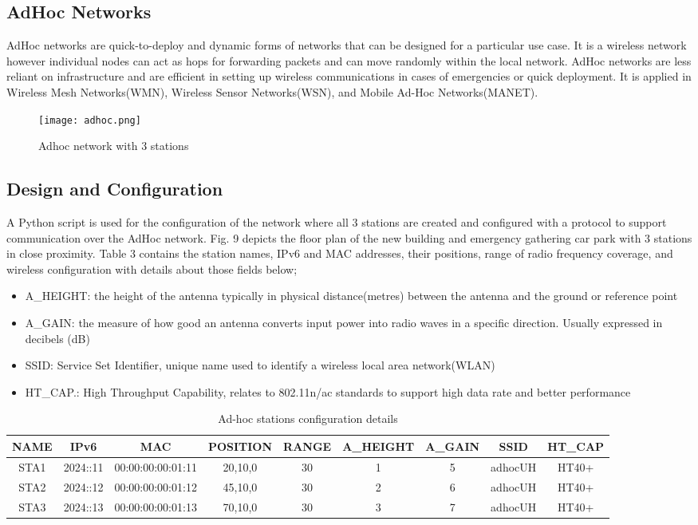 \documentclass{article}
\begin{document}
\subsection{AdHoc Networks}
AdHoc \citep{1010101} networks are quick-to-deploy and dynamic forms of networks that can be designed for a particular use case. It is a wireless network however individual nodes can act as hops for forwarding packets and can move randomly within the local network. AdHoc networks are less reliant on infrastructure and are efficient in setting up wireless communications in cases of emergencies or quick deployment. It is applied in Wireless Mesh Networks(WMN), Wireless Sensor Networks(WSN), and Mobile Ad-Hoc Networks(MANET).
    	\begin{figure}[h]
        		\centering
        		\texttt{[image: adhoc.png]}
        		\caption{Adhoc network with 3 stations}
        		\label{fig:t2-1}
    	\end{figure}
\subsection{Design and Configuration}
A Python script is used for the configuration of the network where all 3 stations are created and configured with a protocol to support communication over the AdHoc network. Fig. 9 depicts the floor plan of the new building and emergency gathering car park with 3 stations in close proximity. Table 3 contains the station names, IPv6 and MAC addresses, their positions, range of radio frequency coverage, and wireless configuration with details about those fields below; 
	\begin{itemize}
		\item A\_HEIGHT: the height of the antenna typically in physical distance(metres) between the antenna and the ground or reference point
		\item A\_GAIN: the measure of how good an antenna converts input power into radio waves in a specific direction. Usually expressed in decibels (dB)
		\item SSID: Service Set Identifier, unique name used to identify a wireless local area network(WLAN)
		\item HT\_CAP.: High Throughput Capability, relates to 802.11n/ac standards to support high data rate and better performance 
	\end{itemize}
    	\begin{table}[h]
		\small
        		\begin{tabular}{|c|c|c|c|c|c|c|c|c|}
        			\hline
        			NAME & IPv6 & MAC & POSITION & RANGE & A\_HEIGHT & A\_GAIN & SSID & HT\_CAP\\
        			\hline
        			STA1 & 2024::11 & 00:00:00:00:01:11 & 20,10,0 & 30 & 1 & 5 & adhocUH & HT40+ \\
        			STA2 & 2024::12 & 00:00:00:00:01:12 & 45,10,0 & 30 & 2 & 6 & adhocUH & HT40+ \\
        			STA3 & 2024::13 & 00:00:00:00:01:13 & 70,10,0 & 30 & 3 & 7 & adhocUH & HT40+ \\
        			\hline
        		\end{tabular}
       	 	\caption{Ad-hoc stations configuration details}
        		\label{tab:3}
    	\end{table}
\newpage
\end{document}
